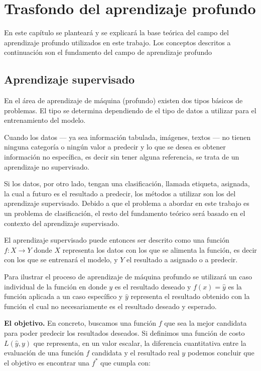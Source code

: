 
\chapter{Trasfondo del aprendizaje profundo} %

\label{Chapter2} %

En este capítulo se planteará y se explicará la base teórica del campo del aprendizaje profundo utilizados en este trabajo. Los conceptos descritos a continuación son el fundamento del campo de aprendizaje profundo


\section{Aprendizaje supervisado}

En el área de aprendizaje de máquina (profundo) existen dos tipos básicos de problemas. El tipo se determina dependiendo de el tipo de datos a utilizar para el entrenamiento del modelo.

Cuando los datos --- ya sea información tabulada, imágenes, textos --- no tienen ninguna categoría o ningún valor a predecir y lo que se desea es obtener información no específica, es decir sin tener alguna referencia, se trata de un aprendizaje no supervisado.

Si los datos, por otro lado, tengan una clasificación, llamada etiqueta, asignada, la cual a futuro es el resultado a predecir, los métodos a utilizar son los del aprendizaje supervisado. Debido a que el problema a abordar en este trabajo es un problema de clasificación, el resto del fundamento teórico será basado en el contexto del aprendizaje supervisado.

El aprendizaje supervisado puede entonces ser descrito como una función $f : X \to Y$ donde $X$ representa los datos con los que se alimenta la función, es decir con los que se entrenará el modelo, y $Y$ el resultado a asignado o a predecir.

Para ilustrar el proceso de aprendizaje de máquina profundo se utilizará un caso individual de la función en donde $y$ es el resultado deseado y $f(x) = \hat{y}$ es la función aplicada a un caso específico y $\hat{y}$ representa el resultado obtenido con la función el cual no necesariamente es el resultado deseado y esperado.

\textbf{El objetivo.} En concreto, buscamos una función $f$ que sea la mejor candidata para poder predecir los resultados deseados. Si definimos una función de costo $L(\hat{y}, y)$ que representa, en un valor escalar, la diferencia cuantitativa entre la evaluación de una función $f$ candidata y el resultado real $y$ podemos concluir que el objetivo es encontrar una $f^*$ que cumpla con:

